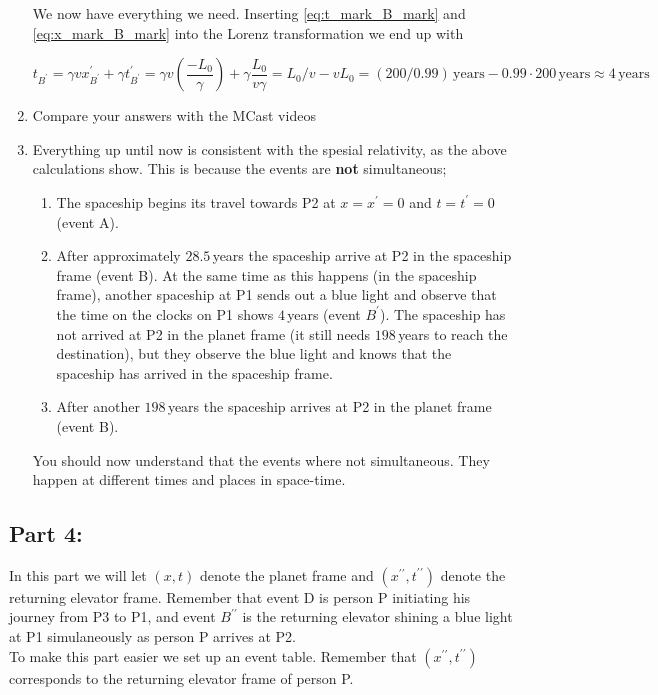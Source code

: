 \documentclass[a4paper,10pt,english]{article}
\begin{document}
\begin{enumerate}
We now have everything we need. Inserting \ref{eq:t_mark_B_mark} and \ref{eq:x_mark_B_mark} into the Lorenz transformation we end up with

\begin{equation*}
t_{B^{\prime}}=\gamma vx^{\prime}_{B^{\prime}}+\gamma t^{\prime}_{B^{\prime}}=\gamma v \left(\frac{-L_{0}}{\gamma}\right)+\gamma \frac{L_{0}}{v\gamma}=L_{0}/v-vL_{0}=(200/0.99)\,\text{years}-0.99\cdot200\,\text{years}\approx4\,\text{years}
\end{equation*}

\item Compare your answers with the MCast videos
\item Everything up until now is consistent with the spesial relativity, as the above calculations show. This is because the events are \textbf{not} simultaneous;

\begin{enumerate}
\item The spaceship begins its travel towards P2 at $x=x^{\prime}=0$ and $t=t^{\prime}=0$ (event A).
\item After approximately $28.5\,$years the spaceship arrive at P2 in the spaceship frame (event B). At the same time as this happens (in the spaceship frame), another spaceship at P1 sends out a blue light and observe that the time on the clocks on P1 shows $4\,$years (event $B^{\prime}$). The spaceship has not arrived at P2 in the planet frame (it still needs $198\,$years to reach the destination), but they observe the blue light and knows that the spaceship has arrived in the spaceship frame.
\item After another $198\,$years the spaceship arrives at P2 in the planet frame (event B).
\end{enumerate}

You should now understand that the events where not simultaneous. They happen at different times and places in space-time.
\end{enumerate}

\subsection*{Part 4:}

In this part we will let $(x,t)$ denote the planet frame and $(x^{\prime\prime},t^{\prime\prime})$ denote the returning elevator frame. Remember that event D is person P initiating his journey from P3 to P1, and event $B^{\prime\prime}$ is the returning elevator shining a blue light at P1 simulaneously as person P arrives at P2.
\\
To make this part easier we set up an event table. Remember that $(x^{\prime\prime},t^{\prime\prime})$ corresponds to the returning elevator frame of person P.
\end{document}
